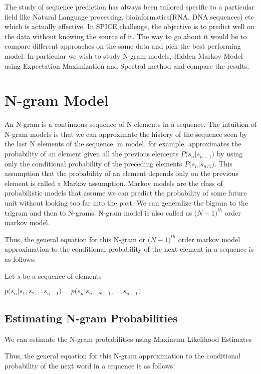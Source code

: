 \documentclass{article} %
\begin{document}
The study of sequence prediction has always been tailored specific to a particular field like Natural Language processing, bioinformatics(RNA, DNA sequences) etc which is actually effective. In SPICE challenge, the objective is to predict well on the data without knowing the source of it. The way to go about it would be to compare different approaches on the same data and pick the best performing model. In particular we wish to study N-gram models, Hidden Markov Model using Expectation Maximization and Spectral method and compare the results.

\section{N-gram Model}
\label{N-Gram Model}

An N-gram is a continuous sequence of N elements in a sequence. The intuition of N-gram models is that we can approximate the history of the sequence seen by the last N elements of the sequence. m model, for example, approximates the probability of an element given all the previous elements $P\big(s_n|s_{n-1}\big)$ by using only the conditional probability of the preceding elements $P\big(s_n|s_{n?1}\big)$. This assumption that the probability of an element depends only on the previous element is called a Markov assumption. Markov models are the class of probabilistic models that assume we can predict the probability of some future unit without looking too far into the past. We can generalize the bigram to the trigram and then to N-grams. N-gram model is also called as $\big(N-1\big)^{th}$ order markov model.

Thus, the general equation for this N-gram or $\big(N-1\big)^{th}$ order markov model approximation to the conditional probability of the next element in a sequence is as follows:

Let $s$ be a sequence of elements

$p\big(s_n|s_1, s_2, . . . s_{n-1}\big) = p\big(s_n|s_{n-N+1}, . . . , s_{n-1}\big)$

\subsection{Estimating N-gram Probabilities}
We can estimate the N-gram probabilities using Maximum Likelihood Estimates 


Thus, the general equation for this N-gram approximation to the conditional probability of the next word in a sequence is as follows:
\end{document}
